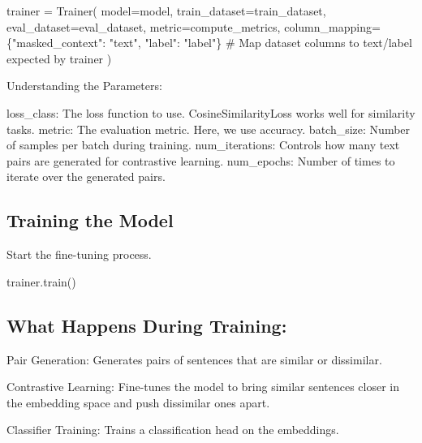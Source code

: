 \documentclass[
  letterpaper,
  DIV=11,
  numbers=noendperiod]{scrreprt}
\newenvironment{Shaded}{\begin{snugshade}}{\end{snugshade}}
\newcommand{\CommentTok}[1]{\textcolor[rgb]{0.37,0.37,0.37}{#1}}
\newcommand{\NormalTok}[1]{\textcolor[rgb]{0.00,0.23,0.31}{#1}}
\newcommand{\OperatorTok}[1]{\textcolor[rgb]{0.37,0.37,0.37}{#1}}
\newcommand{\StringTok}[1]{\textcolor[rgb]{0.13,0.47,0.30}{#1}}
\begin{document}
\begin{Shaded}
\begin{Highlighting}[]
\NormalTok{trainer }\OperatorTok{=}\NormalTok{ Trainer(}
\NormalTok{    model}\OperatorTok{=}\NormalTok{model,}
\NormalTok{    train\_dataset}\OperatorTok{=}\NormalTok{train\_dataset,}
\NormalTok{    eval\_dataset}\OperatorTok{=}\NormalTok{eval\_dataset,}
\NormalTok{    metric}\OperatorTok{=}\NormalTok{compute\_metrics,}
\NormalTok{    column\_mapping}\OperatorTok{=}\NormalTok{\{}\StringTok{"masked\_context"}\NormalTok{: }\StringTok{"text"}\NormalTok{, }\StringTok{"label"}\NormalTok{: }\StringTok{"label"}\NormalTok{\} }\CommentTok{\# Map dataset columns to text/label expected by trainer}
\NormalTok{)}
\end{Highlighting}
\end{Shaded}

Understanding the Parameters:

loss\_class: The loss function to use. CosineSimilarityLoss works well
for similarity tasks. metric: The evaluation metric. Here, we use
accuracy. batch\_size: Number of samples per batch during training.
num\_iterations: Controls how many text pairs are generated for
contrastive learning. num\_epochs: Number of times to iterate over the
generated pairs.

\subsection{Training the Model}\label{training-the-model}

Start the fine-tuning process.

\begin{Shaded}
\begin{Highlighting}[]
\NormalTok{trainer.train()}
\end{Highlighting}
\end{Shaded}

\subsection{What Happens During
Training:}\label{what-happens-during-training}

Pair Generation: Generates pairs of sentences that are similar or
dissimilar.

Contrastive Learning: Fine-tunes the model to bring similar sentences
closer in the embedding space and push dissimilar ones apart.

Classifier Training: Trains a classification head on the embeddings.
\end{document}
